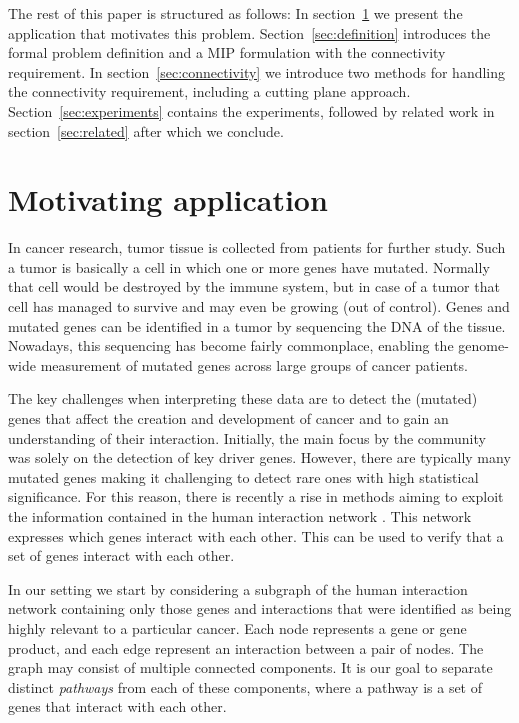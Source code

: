 \documentclass[conference]{IEEEtran}
\begin{document}
The rest of this paper is structured as follows:  In
section~\ref{sec:motivation} we present the application that motivates
this problem.  Section~\ref{sec:definition} introduces the formal
problem definition and a MIP formulation with the connectivity requirement.
In section~\ref{sec:connectivity} we introduce two methods for handling the connectivity requirement, including a cutting plane approach. Section~\ref{sec:experiments} contains the experiments, followed by related work in section~\ref{sec:related} after which we conclude.


\section{Motivating application}
\label{sec:motivation}
In cancer research, tumor tissue is collected from patients for further study. Such a tumor is basically a cell in which one or more genes have mutated. Normally that cell would be destroyed by the immune system, but in case of a tumor that cell has managed to survive and may even be growing (out of control).
Genes and mutated genes can be identified in a tumor by sequencing the DNA of the tissue. Nowadays, this sequencing has become fairly commonplace, enabling the genome-wide measurement of mutated genes across large groups of cancer patients.

The key challenges when interpreting these data are to detect the (mutated) genes that affect the creation and development of cancer and to gain an understanding of their interaction. Initially, the main focus by the community was solely on the detection of key driver genes. However, there are typically many mutated genes making it challenging to detect rare ones with high statistical significance. For this reason, there is recently a rise in methods aiming to exploit the information contained in the human interaction network \cite{some_methods}. This network expresses which genes interact with each other. This can be used to verify that a set of genes interact with each other.

In our setting we start by considering a subgraph of the human interaction network containing only those genes and interactions that were identified as being highly relevant to a particular cancer. Each node represents a gene or gene product, and each edge represent an interaction between a pair of nodes. The graph may consist of multiple connected components. It is our goal to separate distinct \textit{pathways} from each of these components, where a pathway is a set of genes that interact with each other.
\end{document}
